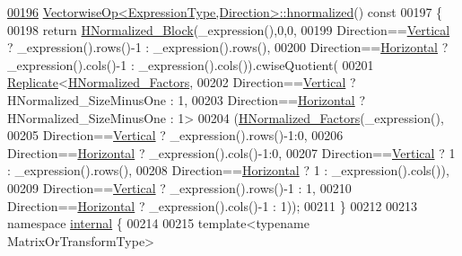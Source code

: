 \begin{DoxyCode}
\hyperlink{group___geometry___module_ga8d3b6f7178b905b0e4418fd4900c4463}{00196} \hyperlink{group___geometry___module_ga8d3b6f7178b905b0e4418fd4900c4463}{VectorwiseOp<ExpressionType,Direction>::hnormalized}()\textcolor{keyword}{
       const}
00197 \textcolor{keyword}{}\{
00198   \textcolor{keywordflow}{return} \hyperlink{group___core___module_class_eigen_1_1_block}{HNormalized\_Block}(\_expression(),0,0,
00199       Direction==\hyperlink{group__enums_ggad49a7b3738e273eb00932271b36127f7addca718e0564723df21d61b94b1198be}{Vertical}   ? \_expression().rows()-1 : \_expression().rows(),
00200       Direction==\hyperlink{group__enums_ggad49a7b3738e273eb00932271b36127f7aae8a16b3b9272683c1162915f6d892be}{Horizontal} ? \_expression().cols()-1 : \_expression().cols()).cwiseQuotient(
00201       \hyperlink{group___core___module_class_eigen_1_1_replicate}{Replicate}<\hyperlink{group___core___module_class_eigen_1_1_block}{HNormalized\_Factors},
00202                 Direction==\hyperlink{group__enums_ggad49a7b3738e273eb00932271b36127f7addca718e0564723df21d61b94b1198be}{Vertical}   ? HNormalized\_SizeMinusOne : 1,
00203                 Direction==\hyperlink{group__enums_ggad49a7b3738e273eb00932271b36127f7aae8a16b3b9272683c1162915f6d892be}{Horizontal} ? HNormalized\_SizeMinusOne : 1>
00204         (\hyperlink{group___core___module_class_eigen_1_1_block}{HNormalized\_Factors}(\_expression(),
00205           Direction==\hyperlink{group__enums_ggad49a7b3738e273eb00932271b36127f7addca718e0564723df21d61b94b1198be}{Vertical}    ? \_expression().rows()-1:0,
00206           Direction==\hyperlink{group__enums_ggad49a7b3738e273eb00932271b36127f7aae8a16b3b9272683c1162915f6d892be}{Horizontal}  ? \_expression().cols()-1:0,
00207           Direction==\hyperlink{group__enums_ggad49a7b3738e273eb00932271b36127f7addca718e0564723df21d61b94b1198be}{Vertical}    ? 1 : \_expression().rows(),
00208           Direction==\hyperlink{group__enums_ggad49a7b3738e273eb00932271b36127f7aae8a16b3b9272683c1162915f6d892be}{Horizontal}  ? 1 : \_expression().cols()),
00209          Direction==\hyperlink{group__enums_ggad49a7b3738e273eb00932271b36127f7addca718e0564723df21d61b94b1198be}{Vertical}   ? \_expression().rows()-1 : 1,
00210          Direction==\hyperlink{group__enums_ggad49a7b3738e273eb00932271b36127f7aae8a16b3b9272683c1162915f6d892be}{Horizontal} ? \_expression().cols()-1 : 1));
00211 \}
00212 
00213 \textcolor{keyword}{namespace }\hyperlink{namespaceinternal}{internal} \{
00214 
00215 \textcolor{keyword}{template}<\textcolor{keyword}{typename} MatrixOrTransformType>

\end{DoxyCode}
